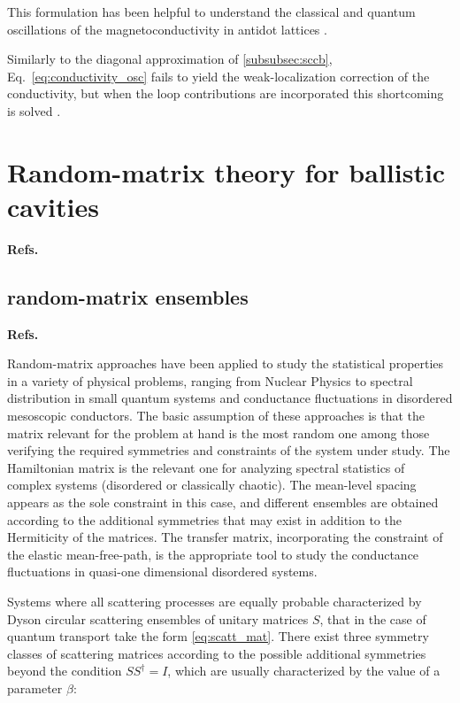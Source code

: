 \documentclass[a4paper,10pt]{article}
\newcommand{\nin}{\noindent}
\begin{document}
\nin This formulation has been helpful to understand the classical and quantum oscillations of the magnetoconductivity in antidot lattices \cite{Weiss93}. 

\nin Similarly to the diagonal approximation of \eqref{subsubsec:sccb}, 
Eq.~\eqref{eq:conductivity_osc} fails to yield the weak-localization correction of the conductivity, but when the loop contributions are incorporated this shortcoming is solved \cite{Richter2002}.

\section{Random-matrix theory for ballistic cavities}
\label{sec:RMT}

{\bf Refs.~\cite{BeenRMP,AlhassidRMP,mello00,mello04}}

\subsection{random-matrix ensembles}

{\bf Refs.~\cite{Bohigas,WeiPR,Haak_01,Fyodorov}}

\nin Random-matrix approaches have been applied to study the statistical properties in a variety of physical problems, ranging from Nuclear Physics to spectral distribution in small quantum systems and conductance fluctuations in disordered mesoscopic conductors. The basic assumption of these approaches is that the matrix relevant for the problem at hand is the most random one among those verifying the required symmetries and constraints of the system under study. The Hamiltonian matrix is the relevant one for analyzing spectral statistics of complex systems (disordered or classically chaotic). The mean-level spacing appears as the sole constraint in this case, and different ensembles are obtained according to the additional symmetries that may exist in addition to the Hermiticity of the matrices. The transfer matrix, incorporating the constraint of the elastic mean-free-path, is the appropriate tool to study the conductance fluctuations in quasi-one dimensional disordered systems.  

\nin Systems where all scattering processes are equally probable characterized by Dyson circular scattering ensembles of unitary matrices $S$, that in the case of quantum transport take the form \eqref{eq:scatt_mat}. There exist three symmetry classes of scattering matrices according to the possible additional symmetries beyond the condition $S S^{\dagger}=I$, which are usually characterized by the value of a parameter $\beta$:
\end{document}
